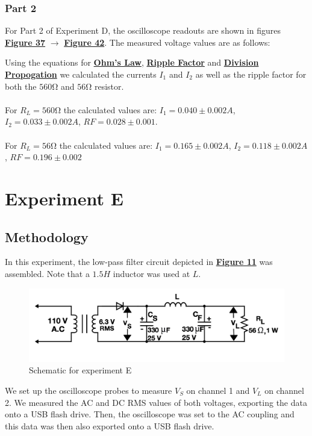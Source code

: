 \documentclass[
	letterpaper
	12pt
]{template}
\newcommand{\bref}[2]{\textbf{\hyperref[#1]{#2}}}
\begin{document}
\subsubsection{Part 2}
For Part 2 of Experiment D, the oscilloscope readouts are shown in figures \bref{data::D4}{Figure 37} $\rightarrow$ \bref{data::D6}{Figure 42}. The measured voltage values are as follows:

Using the equations for \bref{eqn::ohm}{Ohm's Law}, \bref{eqn::ripple}{Ripple Factor} and \bref{prop::div}{Division Propogation} we calculated the currents $I_1$ and $I_2$ as well as the ripple factor for both the $560\unit\ohm$ and $56\unit\ohm$ resistor.\\\\
For $R_L = 560\unit\ohm$ the calculated values are: $I_1= 0.040 \pm 0.002 \unit{A}$, $I_2= 0.033 \pm 0.002 \unit{A}$,  $RF=0.028\pm0.001$. \\\\
For $R_L = 56\unit\ohm$ the calculated values are: $I_1= 0.165 \pm 0.002 \unit{A}$, $I_2= 0.118 \pm 0.002 \unit{A}$, $RF= 0.196\pm0.002$


\section{Experiment E}\label{exp::E}
\subsection{Methodology}\label{method::E}
In this experiment, the low-pass filter circuit depicted in \textbf{\hyperref[apparatus::E]{Figure 11}} was assembled. Note that a $1.5\unit{H}$ inductor was used at $L$.
\begin{figure}[H]\label{apparatus::E}
	\centering
	\begin{minipage}[c]{0.45\textwidth}
		\centering
		\includegraphics[width=\textwidth]{figures/E/schematic.png}
		\caption{Schematic for experiment E \\ \protect\cite{labManual}}
	\end{minipage}
\end{figure}
We set up the oscilloscope probes to measure $V_S$ on channel 1 and $V_L$ on channel 2. We measured the AC and DC RMS values of both voltages, exporting the data onto a USB flash drive. Then, the oscilloscope was set to the AC coupling and this data was then also exported onto a USB flash drive.
\end{document}
